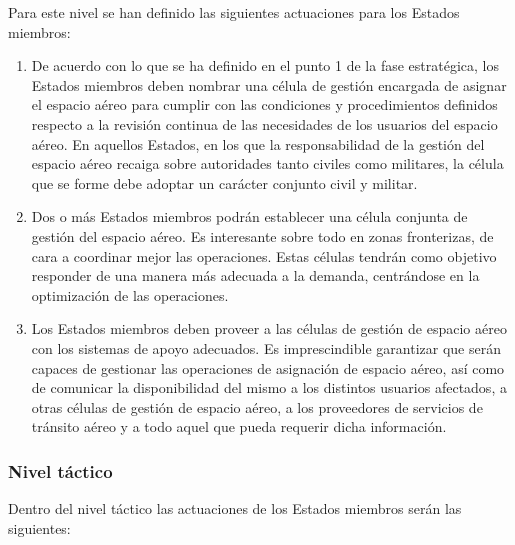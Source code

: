 Para este nivel se han definido las siguientes actuaciones para los Estados miembros:

\begin{enumerate}
    \item De acuerdo con lo que se ha definido en el punto 1 de la fase estratégica, los Estados miembros deben nombrar una célula de gestión encargada de asignar el espacio aéreo para cumplir con las condiciones y procedimientos definidos respecto a la revisión continua de las necesidades de los usuarios del espacio aéreo. En aquellos Estados, en los que la responsabilidad de la gestión del espacio aéreo 	recaiga sobre autoridades tanto civiles como militares, la célula que se forme debe 	adoptar un carácter conjunto civil y militar.
    
    \item Dos o más Estados miembros podrán establecer una célula conjunta de gestión del espacio aéreo. Es interesante sobre todo en zonas fronterizas, de cara a coordinar mejor las 		operaciones. Estas células tendrán como objetivo responder de una manera más 	adecuada a la demanda, centrándose en la optimización de las operaciones.

    \item Los Estados miembros deben proveer a las células de gestión de espacio aéreo con los sistemas de apoyo adecuados. Es imprescindible garantizar que serán capaces de gestionar las operaciones de asignación de espacio aéreo, así como de comunicar la disponibilidad del mismo a los distintos usuarios afectados, a otras células de gestión de espacio aéreo, a los proveedores de servicios de tránsito aéreo y a todo aquel que pueda requerir dicha información.
\end{enumerate}

\subsubsection{Nivel táctico}

Dentro del nivel táctico las actuaciones de los Estados miembros serán las siguientes:

